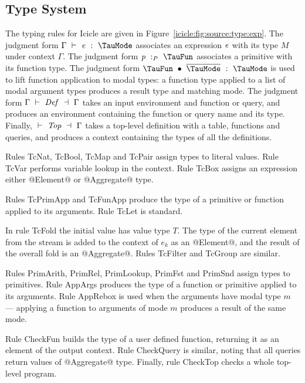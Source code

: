 \subsection{Type System}
The typing rules for Icicle are given in Figure~\ref{icicle:fig:source:type:exp}.
The judgment form $\Typecheck{\Gamma}{\mi{e}}{\TauMode}$ associates an expression $\mathit{e}$ with its type $M$ under context $\Gamma$.
The judgment form $\TypecheckP{\mi{p}}{\TauFun}$ associates a primitive with its function type.
The judgment form $\TypecheckApp{\TauFun}{\ov{\TauMode}}{\TauMode}$ is used to lift function application to modal types: a function type applied to a list of modal argument types produces a result type and matching mode.
The judgment form $\TypecheckS{\Gamma}{\mi{Def}}{\Gamma}$ takes an input environment and function or query, and produces an environment containing the function or query name and its type.
Finally, $\TypecheckS{}{\mi{Top}}{\Gamma}$ takes a top-level definition with a table, functions and queries, and produces a context containing the types of all the definitions.

Rules TcNat, TcBool, TcMap and TcPair assign types to literal values.
Rule TcVar performs variable lookup in the context.
Rule TcBox assigns an expression either @Element@ or @Aggregate@ type. 

Rules TcPrimApp and TcFunApp produce the type of a primitive or function applied to its arguments. Rule TcLet is standard.

In rule TcFold the initial value has value type $T$. The type of the current element from the stream is added to the context of $e_k$ as an @Element@, and the result of the overall fold is an @Aggregate@. Rules TcFilter and TcGroup are similar.

Rules PrimArith, PrimRel, PrimLookup, PrimFst and \mbox{PrimSnd} assign types to primitives.
Rule AppArgs produces the type of a function or primitive applied to its arguments.
Rule AppRebox is used when the arguments have modal type $m$ --- applying a function to arguments of mode $m$ produces a result of the same mode.

Rule CheckFun builds the type of a user defined function, returning it as an element of the output context. Rule CheckQuery is similar, noting that all queries return values of @Aggregate@ type. Finally, rule CheckTop checks a whole top-level program.


